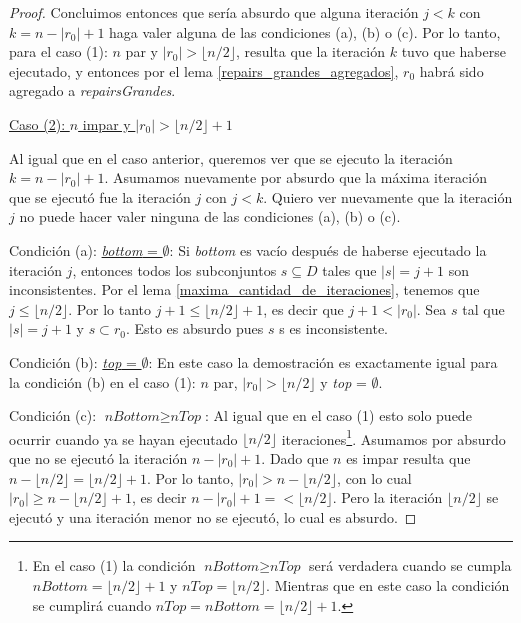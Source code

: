 \documentclass[11pt,a4paper,twoside]{tesis}
\newcommand{\parteEntera}{\lfloor n/2 \rfloor}
\begin{document}
\begin{proof}
Concluimos entonces que sería absurdo que alguna iteración $j<k$ con $k = n - |r_0| + 1$ haga valer alguna de las condiciones (a), (b) o (c). Por lo tanto, para el caso (1): $n$ par y $|r_0| > \parteEntera$, resulta que la iteración $k$ tuvo que haberse ejecutado, y entonces por el lema \ref{repairs_grandes_agregados}, $r_0$ habrá sido agregado a \textit{repairsGrandes}.

\begin{center}
\underline{Caso (2): $n$ impar y $|r_0| > \parteEntera + 1$}
\end{center}


Al igual que en el caso anterior, queremos ver que se ejecuto la iteración $k = n - |r_0| + 1$. Asumamos nuevamente por absurdo que la máxima iteración que se ejecutó fue la iteración $j$ con $j < k$. Quiero ver nuevamente que la iteración $j$ no puede hacer valer ninguna de las condiciones (a), (b) o (c).

Condición (a): \underline{\textit{bottom} = $\emptyset$}: Si \textit{bottom} es vacío después de haberse ejecutado la iteración $j$, entonces todos los subconjuntos $s \subseteq D$ tales que $|s| = j + 1$ son inconsistentes. Por el lema \ref{maxima_cantidad_de_iteraciones}, tenemos que $j\leq \parteEntera$. Por lo tanto $j+1 \leq \parteEntera + 1$, es decir que $j + 1 < |r_0|$. Sea $s$ tal que $|s| = j + 1$ y $s \subset r_0$. Esto es absurdo pues $s$ s es inconsistente.

Condición (b): \underline{\textit{top} = $\emptyset$}: En este caso la demostración es exactamente igual para la condición (b) en el caso (1): $n$ par, $|r_0| > \parteEntera$ y \textit{top} = $\emptyset$. 

Condición (c): \underline{$\textit{nBottom} \geq \textit{nTop}$}: Al igual que en el caso (1) esto solo puede ocurrir cuando ya se hayan ejecutado $\parteEntera$ iteraciones\footnote{En el caso (1) la condición $\textit{nBottom} \geq \textit{nTop}$ será verdadera cuando se cumpla $\textit{nBottom} = \parteEntera + 1$ y $\textit{nTop} = \parteEntera$. Mientras que en este caso la condición se cumplirá cuando $\textit{nTop} = \textit{nBottom} = \parteEntera + 1$.}. Asumamos por absurdo que no se ejecutó la iteración $n - |r_0| + 1$. Dado que $n$ es impar resulta que $n - \parteEntera = \parteEntera + 1$. Por lo tanto, $|r_0| > n - \parteEntera$, con lo cual $|r_0| \geq n - \parteEntera + 1$, es decir  $n - |r_0| + 1 =< \parteEntera$. Pero la iteración $\parteEntera$ se ejecutó y una iteración menor no se ejecutó, lo cual es absurdo.


\end{proof}
\end{document}
